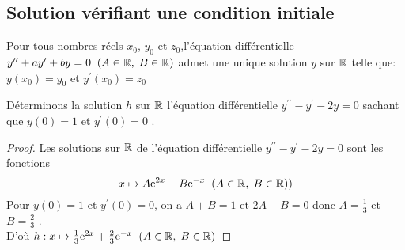 \subsection*{Solution vérifiant une condition initiale}
\begin{property}
Pour tous nombres réels $x_{0} $, $ y_{0} $  et $z_{0} $,\;l'équation différentielle $ y^{\prime \prime}+ ay^{\prime}+by=0\;\;(A\in\mathbb{R},\; B\in\mathbb{R})$ admet une unique solution  $ y $ sur $ \mathbb{R} $ telle que: $ y(x_{0})=y_{0} $ et  $ y^{\prime}(x_{0})=z_{0} $
\end{property}
\begin{example}
Déterminons la solution $ h $ sur $ \mathbb{R} $ l'équation différentielle\;  $ y^{\prime \prime}-y^{\prime} -2y=0 $\; sachant que  $ y(0)=1 $ et $ y^{\prime}(0)=0 $ . 

\end{example}
\begin{proof}
 Les solutions sur $ \mathbb{R} $ de l'équation différentielle  \;$ y^{\prime \prime}-y^{\prime}-2y=0 $  sont les fonctions
$$ x\mapsto A\mathrm{e}^{2 x}+B\mathrm{e}^{-x} \;\;(A\in\mathbb{R},\; B\in\mathbb{R}))$$  
Pour  $ y(0)=1 $ et $ y^{\prime}(0)=0 $, on a $ A+B=1 $  et $ 2A-B=0 $ \; donc  $ A=\frac{1}{3}$ et $B=\frac{2}{3} $ . \\
D'où \; $ h: x\mapsto \frac{1}{3} \mathrm{e}^{2 x}+\frac{2}{3}\mathrm{e}^{-x} \;\;(A\in\mathbb{R},\; B\in\mathbb{R})$

\end{proof}

